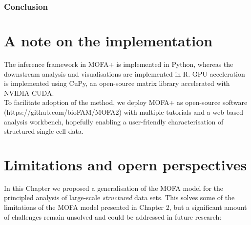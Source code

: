 \subsubsection{Conclusion}



\section{A note on the implementation}

The inference framework in MOFA+ is implemented in Python, whereas the downstream analysis and visualisations are implemented in R. GPU acceleration is implemented using CuPy\cite{Okuta2017}, an open-source matrix library accelerated with NVIDIA CUDA.\\
To facilitate adoption of the method, we deploy MOFA+ as open-source software (https://github.com/bioFAM/MOFA2) with multiple tutorials and a web-based analysis workbench, hopefully enabling a user-friendly characterisation of structured single-cell data.


\section{Limitations and opern perspectives}

In this Chapter we proposed a generalisation of the MOFA model for the principled analysis of large-scale \textit{structured} data sets. This solves some of the limitations of the MOFA model presented in Chapter 2, but a significant amount of challenges remain unsolved and could be addressed in future research:

